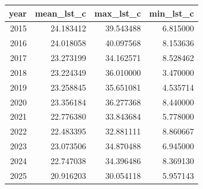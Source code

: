 \begin{tabular}{rrrr}
\toprule
year & mean\_lst\_c & max\_lst\_c & min\_lst\_c \\
\midrule
2015 & 24.183412 & 39.543488 & 6.815000 \\
2016 & 24.018058 & 40.097568 & 8.153636 \\
2017 & 23.273199 & 34.162571 & 8.528462 \\
2018 & 23.224349 & 36.010000 & 3.470000 \\
2019 & 23.258845 & 35.651081 & 4.535714 \\
2020 & 23.356184 & 36.277368 & 8.440000 \\
2021 & 22.776380 & 33.843684 & 5.778000 \\
2022 & 22.483395 & 32.881111 & 8.860667 \\
2023 & 23.073506 & 34.870488 & 6.945000 \\
2024 & 22.747038 & 34.396486 & 8.369130 \\
2025 & 20.916203 & 30.054118 & 5.957143 \\
\bottomrule
\end{tabular}
